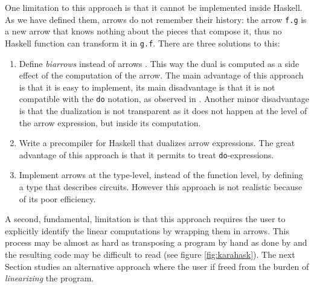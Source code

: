 One limitation to this approach is that it cannot be implemented
inside Haskell. As we have defined them, arrows do not remember their
history: the arrow \lstinline+f.g+ is a new arrow that knows nothing
about the pieces that compose it, thus no Haskell function can
transform it in \lstinline+g.f+. There are three solutions to this:
\begin{enumerate}
\item Define \emph{biarrows} instead of arrows \cite{ASWEP05}. This
  way the dual is computed as a side effect of the computation of the
  arrow. The main advantage of this approach is that it is easy to
  implement, its main disadvantage is that it is not compatible with
  the \lstinline+do+ notation, as observed in \cite{ASWEP05}. Another
  minor disadvantage is that the dualization is not transparent as it
  does not happen at the level of the arrow expression, but inside its
  computation.
\item Write a precompiler for Haskell that dualizes arrow
  expressions. The great advantage of this approach is that it permits
  to treat \lstinline+do+-expressions.
\item Implement arrows at the type-level, instead of the function
  level, by defining a type that describes circuits. However this
  approach is not realistic because of its poor efficiency.
\end{enumerate}

A second, fundamental, limitation is that this approach requires the
user to explicitly identify the linear computations by wrapping them
in arrows. This process may be almost as hard as transposing a program
by hand as done by \cite{BoLeSc03} and the resulting code may be
difficult to read (see figure \ref{fig:karahask}). The next Section
studies an alternative approach where the user if freed from the
burden of \emph{linearizing} the program.



%
